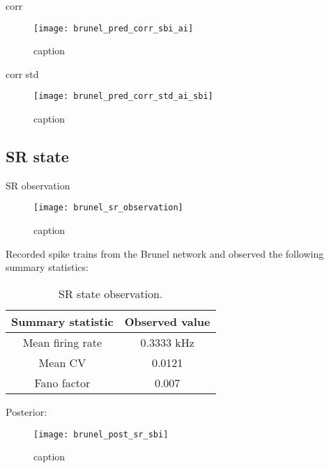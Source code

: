 corr 

\begin{figure}[H]
    \centering
    \texttt{[image: brunel\_pred\_corr\_sbi\_ai]}
    \caption{caption}
    \label{fig:fig1}
\end{figure}

corr std

\begin{figure}[H]
    \centering
    \texttt{[image: brunel\_pred\_corr\_std\_ai\_sbi]}
    \caption{caption}
    \label{fig:fig1}
\end{figure}

\subsection{SR state}

SR observation

\begin{figure}[H]
    \centering
    \texttt{[image: brunel\_sr\_observation]}
    \caption{caption}
    \label{fig:fig1}
\end{figure}

Recorded spike trains from the Brunel network and observed the following summary statistics:

\begin{table}[H]
  \caption{SR state observation.}
  \begin{center}
    \begin{tabular}{cc}
      \toprule
      \textbf{Summary statistic} & \textbf{Observed value} \\
      \midrule
      Mean firing rate &  0.3333 kHz \\
      Mean CV &  0.0121  \\
      Fano factor & 0.007  \\
      \bottomrule
    \end{tabular}
  \end{center}
  \label{tab:hh_noisy_sumstats}
\end{table}

Posterior:

\begin{figure}[H]
    \centering
    \texttt{[image: brunel\_post\_sr\_sbi]}
    \caption{caption}
    \label{fig:fig1}
\end{figure}

